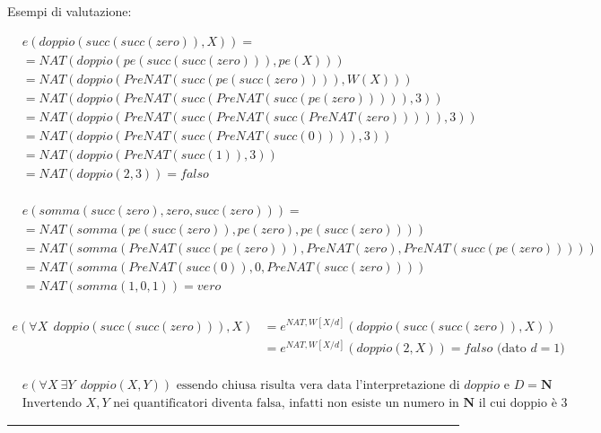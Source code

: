 \documentclass{article}
\begin{document}
Esempi di valutazione:

\begin{equation}
    \nonumber
    \begin{split}
        &e(doppio(succ(succ(zero)),X))=\\
        &=NAT(doppio(pe(succ(succ(zero))),pe(X)))\\
        &=NAT(doppio(PreNAT(succ(pe(succ(zero)))),W(X)))\\
        &=NAT(doppio(PreNAT(succ(PreNAT(succ(pe(zero))))),3))\\
        &=NAT(doppio(PreNAT(succ(PreNAT(succ(PreNAT(zero))))),3))\\
        &=NAT(doppio(PreNAT(succ(PreNAT(succ(0)))),3))\\
        &=NAT(doppio(PreNAT(succ(1)),3))\\
        &=NAT(doppio(2,3))=falso\\
    \end{split}  
\end{equation}

\begin{equation}
    \nonumber
    \begin{split}
        &e(somma(succ(zero),zero,succ(zero)))=\\
        &=NAT(somma(pe(succ(zero)),pe(zero),pe(succ(zero))))\\
        &=NAT(somma(PreNAT(succ(pe(zero))),PreNAT(zero),PreNAT(succ(pe(zero)))))\\
        &=NAT(somma(PreNAT(succ(0)),0,PreNAT(succ(zero))))\\
        &=NAT(somma(1,0,1))=vero\\ 
    \end{split}  
\end{equation}

\begin{equation}
    \nonumber
    \begin{split}
        e(\forall X\ \ doppio(succ(succ(zero))),X)&=e^{NAT,W[X/d]}(doppio(succ(succ(zero)),X))\\
        &=e^{NAT,W[X/d]}(doppio(2,X))= falso \text{ (dato }d=1)\\
    \end{split}  
\end{equation}

\begin{equation}
    \nonumber
    \begin{split}
        &e(\forall X\ \exists Y\ \ doppio(X,Y)) \text{ essendo chiusa risulta vera data l'interpretazione di $doppio$ e $D=\mathbf{N}$}\\
        & \text{Invertendo $X,Y$ nei quantificatori diventa falsa, infatti non esiste un numero in $\mathbf{N}$ il cui doppio è 3}
    \end{split}  
\end{equation}

\noindent\rule{\textwidth}{0.5pt}
\end{document}
